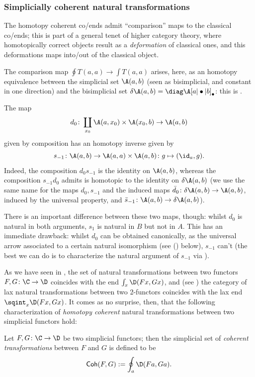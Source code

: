 \subsubsection{\bf Simplicially coherent natural transformations}
\begin{remark}
The homotopy coherent co/ends admit ``comparison'' maps to the classical co/ends; this is part of a general tenet of higher category theory, where homotopically correct objects result as a \emph{deformation} of classical ones, and this deformations maps into/out of the classical object.

The comparison map $\oint T(a,a) \to \int T(a,a)$ arises, here, as an homotopy equivalence between the simplicial set $\A(a,b)$ (seen as bisimplicial, and constant in one direction) and the bisimplicial set $\delta \A(a,b) = \diag \A[a|\bullet|b]_\bullet$: this is \cite[p. 15]{cordier1997homotopy}.

The map
\[
d_0 \colon \coprod_{x_0} \A(a, x_0)\times \A(x_0,b) \to \A(a,b)
\]
given by composition has an homotopy inverse given by
\[
s_{-1}\colon \A(a,b) \to \A(a, a)\times \A(a,b)\colon g\mapsto (\id_a, g).
\]
Indeed, the composition $d_0 s_{-1}$ is the identity on $\A(a,b)$, whereas the composition $s_{-1} d_0$ admits  is homotopic to the identity on $\delta \A(a,b)$ (we use the same name for the maps $d_0, s_{-1}$ and the induced   maps $\bar d_0 \colon \delta \A(a,b) \to \A(a,b)$, induced by the universal property, and $\bar s_{-1}\colon \A(a,b) \to \delta \A(a,b)$).

There is an important difference between these two maps, though: whilst $d_0$ is natural in both arguments, $s_1$ is natural in $B$ but not in $A$. This has an immediate drawback: whilst $d_0$ can be obtained canonically, as the universal arrow associated to a certain natural isomorphism (see () below), $s_{-1}$ can't (the best we can do is to characterize the natural argument of $s_{-1}$ via \cite[Example \textbf{2}, p. 16]{cordier1997homotopy}).
\end{remark}
As we have seen in , the set of natural transformations between two functors $F,G \colon \C \to \D$ coincides with the end $\int_x \D(Fx, Gx)$, and (see ) the category of lax natural transformations between two 2-functors coincides with the lax end $\sqint_x \D(Fx, Gx)$. It comes as no surprise, then, that the following characterization of \emph{homotopy coherent} natural transformations between two simplicial functors hold:
\begin{definition}
Let $F,G \colon \C \to \D$ be two simplicial functors; then the simplicial set of \emph{coherent transformations} between $F$ and $G$ is defined to be
\[
\textsf{Coh}(F,G) := \oint_a \D(Fa, Ga).
\]
\end{definition}
